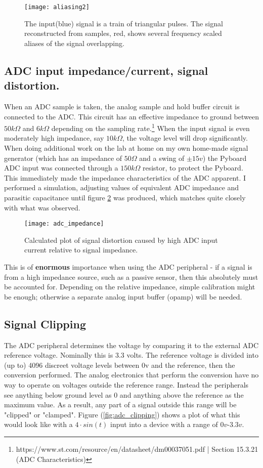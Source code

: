 \documentclass[11pt]{article}
\begin{document}
{	\begin{figure}[H]
		\centering
		\texttt{[image: aliasing2]}
		\caption{The input(blue) signal is a train of triangular pulses. The signal reconstructed from samples, red, shows several frequency scaled aliases of the signal overlapping.}
		\label{fig:aliasing2}
		\vspace{15px}
	\end{figure}
	
	\subsection{ADC input impedance/current, signal distortion.}
	When an ADC sample is taken, the analog sample and hold buffer circuit is connected to the ADC. This circuit has an effective impedance to ground between $50k\Omega$ and $6k\Omega$ depending on the sampling rate.\footnote{https://www.st.com/resource/en/datasheet/dm00037051.pdf | Section 15.3.21 (ADC Characteristics)} When the input signal is even moderately high impedance, say $10k\Omega$, the voltage level will drop significantly. When doing additional work on the lab at home on my own home-made signal generator (which has an impedance of $50\Omega$ and a swing of $\pm 15v$) the Pyboard ADC input was connected through a $150k\Omega$ resistor, to protect the Pyboard. This immediately made the impedance characteristics of the ADC apparent. I performed a simulation, adjusting values of equivalent ADC impedance and parasitic capacitance until figure \ref{fig:adc_impedance} was produced, which matches quite closely with what was observed.
	\begin{figure}[H]
		\centering
		\texttt{[image: adc\_impedance]}
		\caption{Calculated plot of signal distortion caused by high ADC input current relative to signal impedance.}
		\label{fig:adc_impedance}
		\vspace{15px}
	\end{figure}
	This is of \textbf{enormous} importance when using the ADC peripheral - if a signal is from a high impedance source, such as a passive sensor, then this absolutely must be accounted for. Depending on the relative impedance, simple calibration might be enough; otherwise a separate analog input buffer (opamp) will be needed.
	
	\subsection{Signal Clipping}
	The ADC peripheral determines the voltage by comparing it to the external ADC reference voltage. Nominally this is 3.3 volts. The reference voltage is divided into (up to) 4096 discreet voltage levels between 0v and the reference, then the conversion performed. The analog electronics that perform the conversion have no way to operate on voltages outside the reference range. Instead the peripherals see anything below ground level as 0 and anything above the reference as the maximum value. As a result, any part of a signal outside this range will be "clipped" or "clamped". Figure (\ref{fig:adc_clipping}) shows a plot of what this would look like with a $4\cdot sin(t)$ input into a device with a range of $0v$-$3.3v$. 
	
}
\end{document}
